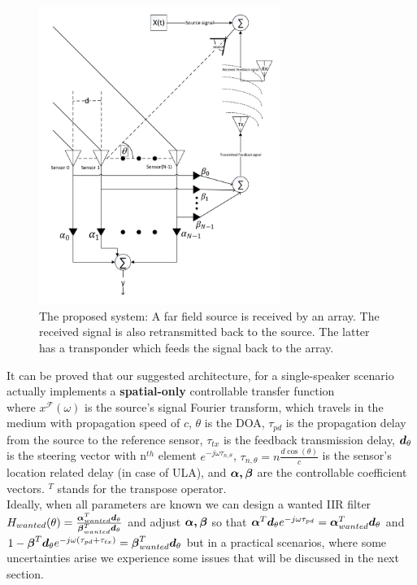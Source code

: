 \documentclass[12pt]{article}
\begin{document}
\begin{figure}[!ht]
\begin{center}
\includegraphics[width=0.7\textwidth]{./Media/SpatialIIR-diagram/SpatialIIR_VER4.pdf}
\caption
{
The proposed system: A far field source is received by an array. 
The received signal is also retransmitted back to the source. 
The latter has a transponder which feeds the signal back to the array.
}
\label{fig:SignalModel}
\end{center}
\end{figure}

It can be proved that our suggested architecture, for a single-speaker scenario actually implements a \textbf{spatial-only} controllable transfer function
$$

$$
where $ x^{\mathcal{F}}(\omega) $ is the source's signal Fourier transform, which travels in the medium with propagation speed of $ c $, $ \theta $ is the DOA, $ \tau_{pd}$ is the propagation delay from the source to the reference sensor, $ \tau_{tx} $ is the feedback transmission delay, $\vecnot{d}_{\theta}$ is the steering vector with n$ ^{th} $ element $e^{-j\omega \tau_{n,\theta}}$, $ \tau_{n,\theta}=n\frac{d\cos(\theta)}{c} $ is the sensor's location related delay (in case of ULA), and $\vecnot{\alpha,\beta}$ are the controllable coefficient vectors.
$^{T}$ stands for the transpose operator.
\\
Ideally, when all parameters are known we can design a wanted IIR filter 
$ 
H_{wanted}(\theta) = \frac{\vecnot{\alpha}_{wanted}^{T}\vecnot{d}_{\theta}}{\vecnot{\beta}_{wanted}^{T}\vecnot{d}_{\theta}}
$ 
and adjust 
$
\vecnot{\alpha,\beta}
$ 
so that 
$ 
\vecnot{\alpha}^{T}\vecnot{d}_{\theta}e^{-j\omega \tau_{pd}} = \vecnot{\alpha}_{wanted}^{T}\vecnot{d}_{\theta} 
$ 
and 
$ 1 - \vecnot{\beta}^{T}\vecnot{d}_{\theta}e^{-j\omega (\tau_{pd}+\tau_{tx})} = \vecnot{\beta}_{wanted}^{T}\vecnot{d}_{\theta} 
$
but in a practical scenarios, where some uncertainties arise we experience some issues that will be discussed in the next section.
\end{document}
